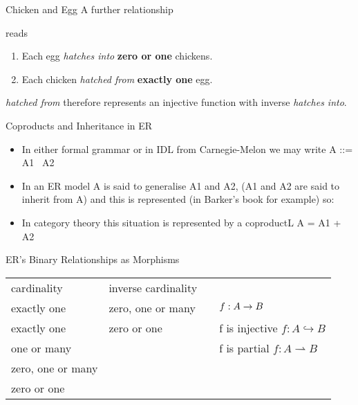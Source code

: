 \documentclass[xcolor=pst,dvips]{beamer}   %
\renewcommand{\erpictureFolder}[0]{../../SharedPictures}
\begin{document}
\begin{frame}{Chicken and Egg}
A further relationship 
\begin{center}
\scalebox{0.9}{

}
\end{center}
reads
\begin{center}
\begin{enumerate}
\item Each egg \textit{hatches into} \textbf{zero or one} chickens.
\item Each chicken \textit{hatched from} \textbf{exactly one} egg.
\end{enumerate}
\end{center}
 \textit{hatched from} therefore represents an injective function with inverse \textit{hatches into}.
\end{frame}


\begin{frame}{Coproducts and Inheritance in ER}
\begin{itemize}
\pause \item In either formal grammar or in IDL from Carnegie-Melon we may write A ::= A1 \textbar\  A2
\pause \item In an ER model  A is said to generalise A1 and A2, (A1 and A2 are said to inherit from A) and this is represented
(in Barker's book for example) so:
\begin{center}
\scalebox{0.85}{

}
\end{center}
\pause \item In category theory this situation is represented by a coproductL A = A1 + A2  
\end{itemize}
\end{frame}




\begin{frame}{ER's Binary Relationships as Morphisms}
\footnotesize
\begin{tabular} {l l l l}
cardinality        & inverse cardinality &     &\\
exactly one        & zero, one or many   &     & $f: A \rightarrow B$\\
exactly one        & zero or one         &     & f is injective $f: A \hookrightarrow B$\\
one or many        &                     &     &f is partial $f:A \rightharpoonup B$\\
zero, one or many  &                     &     &\\
zero or one        &                     &     &\\
\end{tabular}
\end{frame}
\end{document}
